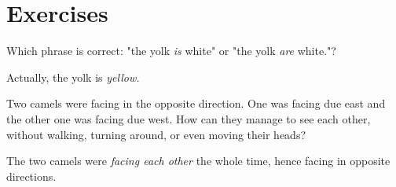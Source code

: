 \documentclass{article}
\begin{document}
\section*{Exercises}

\begin{exercise*}
    \label{exercise:pi-2022-4-p5}
    Which phrase is correct: "the yolk \textit{is} white" or "the yolk \textit{are} white."?
\end{exercise*}

\begin{soln} 
    Actually, the yolk is \textit{yellow.}
\end{soln}

\begin{exercise*}
    \label{exercise:pi-2022-4-p6}
    Two camels were facing in the opposite direction.
    One was facing due east and the other one was facing due west.
    How can they manage to see each other, without walking, turning around, or even moving their heads?
\end{exercise*}

\begin{soln} 
    The two camels were \textit{facing each other} the whole time, hence facing in opposite directions.
\end{soln}
\end{document}
